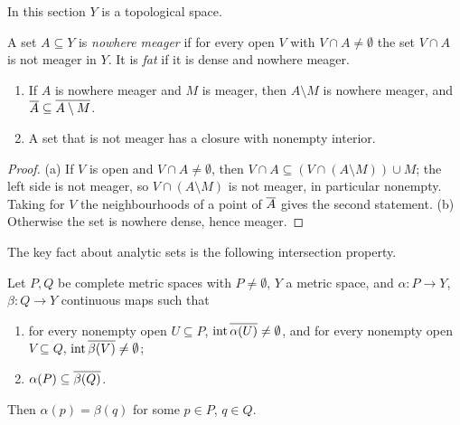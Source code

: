 In this section $Y$ is a topological space.

\begin{definition}\label{def:fat}
A set $A\subseteq Y$ is \emph{nowhere meager} if for every open $V$ with $V\cap A\neq\emptyset$ the set
$V\cap A$ is not meager in $Y$. It is \emph{fat} if it is dense and nowhere meager.
\end{definition}


\begin{lemma}\label{lem:fat-basic}
\begin{enumerate}[label=(\alph*)]
\item If $A$ is nowhere meager and $M$ is meager, then $A\setminus M$ is nowhere meager, and
$\overline{A}\subseteq\overline{A\setminus M}$.
\item A set that is not meager has a closure with nonempty interior.
\end{enumerate}
\end{lemma}

\begin{proof}
(a) If $V$ is open and $V\cap A\ne\emptyset$, then $V\cap A\subseteq(V\cap(A\setminus M))\cup M$; the left side
is not meager, so $V\cap(A\setminus M)$ is not meager, in particular nonempty. Taking for $V$ the
neighbourhoods of a point of $\overline{A}$ gives the second statement.
(b) Otherwise the set is nowhere dense, hence meager.
\end{proof}


The key fact about analytic sets is the following intersection property.

\begin{lemma}\label{lem:core-construction}
Let $P,Q$ be complete metric spaces with $P\ne\emptyset$, $Y$ a metric space, and $\alpha\colon P\to Y$,
$\beta\colon Q\to Y$ continuous maps such that
\begin{enumerate}[label=(\roman*)]
\item for every nonempty open $U\subseteq P$, $\operatorname{int}\overline{\alpha(U)}\neq\emptyset$, and for every nonempty
open $V\subseteq Q$, $\operatorname{int}\overline{\beta(V)}\ne\emptyset$;
\item $\alpha(P)\subseteq\overline{\beta(Q)}$.
\end{enumerate}
Then $\alpha(p)=\beta(q)$ for some $p\in P$, $q\in Q$.
\end{lemma}

